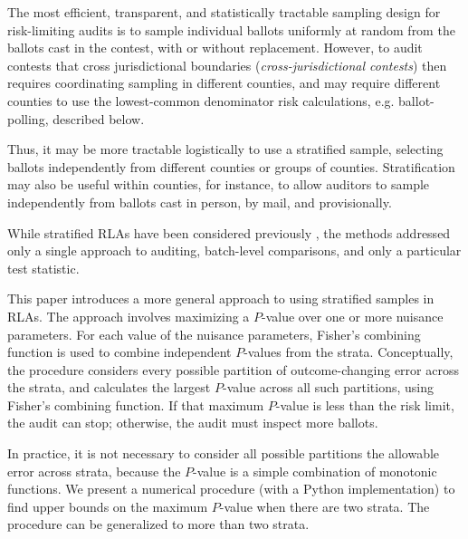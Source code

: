 \documentclass[runningheads]{llncs}
\newcommand{\comment}[1]{\textcolor{red}{\sc #1}}
\begin{document}

The most efficient, transparent, and statistically tractable sampling design for risk-limiting audits is to sample individual ballots uniformly at random from the ballots cast in the contest, with or without replacement.
However, to audit contests that cross jurisdictional boundaries (\emph{cross-jurisdictional contests}) then requires coordinating sampling in different counties, and may require different counties to use the lowest-common denominator risk calculations, e.g. ballot-polling, described below. 

Thus, it may be more tractable logistically to use a stratified sample, selecting ballots independently from different counties or groups of counties. 
Stratification may also be useful within counties, for instance, to allow auditors to sample independently from ballots cast in person, by mail, and provisionally.

While stratified RLAs have been considered previously \cite{stark08a,higginsEtal11}, the methods addressed only a single approach to auditing, batch-level comparisons, and only a particular test statistic.

This paper introduces a more general approach to using stratified samples in RLAs.
The approach involves maximizing a $P$-value over one or more nuisance parameters.
For each value of the nuisance parameters, Fisher's combining function is used to combine independent $P$-values from the strata. 
Conceptually, the procedure considers every possible partition of outcome-changing error across the strata, and calculates the largest
$P$-value across all such partitions, using Fisher's combining function.
If that maximum $P$-value is less than the risk limit, the audit can stop;
otherwise, the audit must inspect more ballots.

In practice, it is not necessary to consider all possible partitions the allowable error across strata, because the $P$-value is a simple combination of monotonic functions.
We present a numerical procedure (with a Python implementation)
to find upper bounds on the maximum $P$-value when there are two strata.
The procedure can be generalized to more than two strata.
\end{document}
